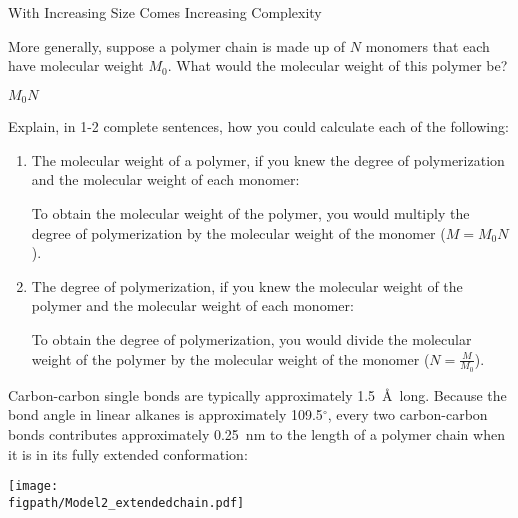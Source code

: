 \begin{activity}{With Increasing Size Comes Increasing Complexity}
\begin{ctqs}
	\question More generally, suppose a polymer chain is made up of $N$ monomers that each have molecular weight $M_0$.  What would the molecular weight of this polymer be?
	
		\begin{solution}[1in]
			$M_0 N$
		\end{solution}
	
	\question Explain, in 1-2 complete sentences, how you could calculate each of the following:
	
		\begin{enumerate}
			\item The molecular weight of a polymer, if you knew the degree of polymerization and the molecular weight of each monomer:
	
		\begin{solution}[1.75in]
			To obtain the molecular weight of the polymer, you would multiply the degree of polymerization by the molecular weight of the monomer ($M = M_0 N$).
		\end{solution}
			
			\item The degree of polymerization, if you knew the molecular weight of the polymer and the molecular weight of each monomer:
	
		\begin{solution}[1.75in]
			To obtain the degree of polymerization, you would divide the molecular weight of the polymer by the molecular weight of the monomer ($N = \frac{M}{M_0}$).
		\end{solution}
		
		\end{enumerate}
	
\end{ctqs}



\begin{model}
	\label{\labelbase:mdl:polyethylenesize}
	
	Carbon-carbon single bonds are typically approximately 1.5~\AA\ long.  Because the bond angle in linear alkanes is approximately 109.5${}^\circ$, every two carbon-carbon bonds contributes approximately 0.25~nm to the length of a polymer chain when it is in its fully extended conformation:
	
	\vspace{6pt}
	\centerline{\texttt{[image: \\figpath/Model2\_extendedchain.pdf]}}

\end{model}


\end{activity}
